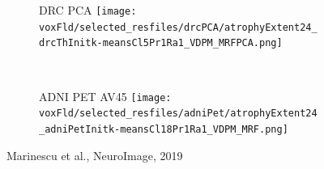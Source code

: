 \begin{frame}
\begin{figure}[h]
  \begin{subfigure}[b]{0.2 \textwidth}
   \centering
   \Large{DRC PCA}
  \texttt{[image: \\voxFld/selected\_resfiles/drcPCA/atrophyExtent24\_drcThInitk-meansCl5Pr1Ra1\_VDPM\_MRFPCA.png]}
  \end{subfigure}
  ~
  \begin{subfigure}[b]{0.2 \textwidth}
   \centering
   \Large{ADNI PET AV45}
  \texttt{[image: \\voxFld/selected\_resfiles/adniPet/atrophyExtent24\_adniPetInitk-meansCl18Pr1Ra1\_VDPM\_MRF.png]}
  \end{subfigure}
  
  \small{Marinescu et al., NeuroImage, 2019}\\

\end{figure}


\end{frame}



